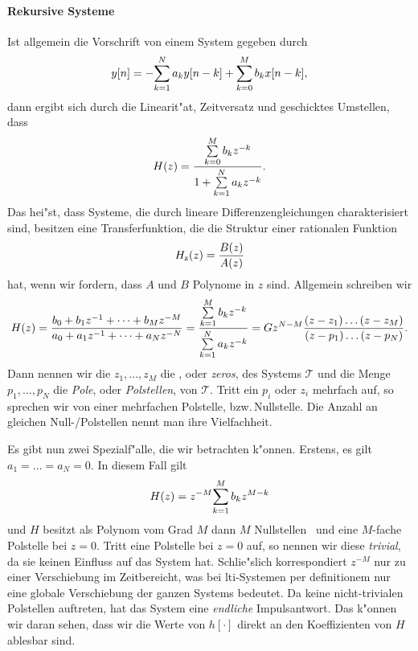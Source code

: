 \paragraph{Rekursive Systeme}
Ist allgemein die Vorschrift von einem System gegeben durch
\[
y[n] = -{\sum\limits_{k=1}^{N}{a_k y[n-k]}} + {\sum\limits_{k=0}^{M}{b_k x[n - k]}},
\]
dann ergibt sich durch die Linearit"at, Zeitversatz und geschicktes Umstellen, dass
\[
    H(z) = \frac{{\sum\limits_{k=0}^{M}{b_k z^{-k}}}}{1 + {\sum\limits_{k=1}^{N}{a_k z^{-k}}}}.
\]
Das hei"st, dass Systeme, die durch lineare Differenzengleichungen charakterisiert sind, besitzen eine Transferfunktion, die die Struktur einer rationalen Funktion
\[
H_{\rm z}(z) = \frac{B(z)}{A(z)}
\]
hat, wenn wir fordern, dass $A$ und $B$ Polynome in $z$ sind.
Allgemein schreiben wir
\[
H(z) = 
    \frac{
        b_0 + b_1 z^{-1} + \dots + b_M z^{-M}
    }{
        a_0 + a_1 z^{-1} + \dots + a_N z^{-N}
    }
    = \frac{
        {\sum\limits_{k = 1}^{M}{b_k z^{-k}}}
    }{
        {\sum\limits_{k = 1}^{N}{a_k z^{-k}}}
    }
    = G z^{N - M} \frac{
        (z - z_1) \dots (z - z_M)
    }{
        (z - p_1) \dots (z - p_N)
    }.
\]
Dann nennen wir die $z_1, \dots, z_M$ die , oder \emph{zeros}, des Systems $\mathcal{T}$ und die Menge $p_1 ,\dots, p_N$ die \emph{Pole}, oder \emph{Polstellen}, von $\mathcal{T}$.
Tritt ein $p_i$ oder $z_i$ mehrfach auf, so sprechen wir von einer mehrfachen Polstelle, bzw.\,Nullstelle.
Die Anzahl an gleichen Null-/Polstellen nennt man ihre Vielfachheit.

Es gibt nun zwei Spezialf"alle, die wir betrachten k"onnen. 
Erstens, es gilt $a_1 = \dots = a_N = 0$. 
In diesem Fall gilt 
\[
H(z) = z^{-M} {\sum\limits_{k = 1}^{M}{b_k z^{M-k}}}
\]
und $H$ besitzt als Polynom vom Grad $M$ dann $M$ Nullstellen~ und eine $M$-fache Polstelle bei $z=0$.
Tritt eine Polstelle bei $z=0$ auf, so nennen wir diese \emph{trivial}, da sie keinen Einfluss auf das System hat.
Schlie"slich korrespondiert $z^{-M}$ nur zu einer Verschiebung im Zeitbereicht, was bei \gls{lti}-Systemen per definitionem nur eine globale Verschiebung der ganzen Systems bedeutet.
Da keine nicht-trivialen Polstellen auftreten, hat das System eine \emph{endliche} Impulsantwort.
Das k"onnen wir daran sehen, dass wir die Werte von $h[\cdot]$ direkt an den Koeffizienten von $H$ ablesbar sind.

